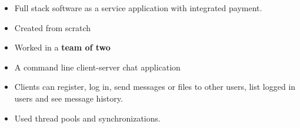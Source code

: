 

















\begin{itemize}

\item Full stack software as a service application with integrated payment.

\item Created from scratch

\item Worked in a \textbf{team of two}

\end{itemize}

\begin{footnotesize}
\end{footnotesize}


\divider




\begin{itemize}

\item A command line client-server chat application

\item Clients can register, log in, send messages or files to other users, list logged in users and see message history.

\item Used thread pools and synchronizations.

\end{itemize}


